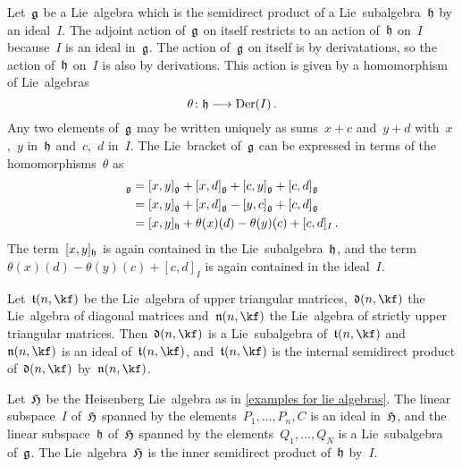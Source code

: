 \begin{fluff}
  \label{calculating structure of internal semidirect product}
  Let~$\mathfrak{g}$ be a Lie~algebra which is the semidirect product of a Lie~subalgebra~$\mathfrak{h}$ by an ideal~$I$.
  The adjoint action of~$\mathfrak{g}$ on itself restricts to an action of~$\mathfrak{h}$ on~$I$ because~$I$ is an ideal in~$\mathfrak{g}$.
  The action of~$\mathfrak{g}$ on itself is by derivatations, so the action of~$\mathfrak{h}$ on~$I$ is also by derivations.
  This action is given by a homomorphism of Lie~algebras
  \[
    \theta
    \colon
    \hlie
    \to
    \Der(I) \,.
  \]
  Any two elements of~$\mathfrak{g}$ may be written uniquely as sums~$x + c$ and~$y + d$ with~$x$,~$y$ in~$\mathfrak{h}$ and~$c$,~$d$ in~$I$.
  The Lie~bracket of~$\mathfrak{g}$ can be expressed in terms of the homomorphisms~$\theta$ as
  \begin{align*}
    [x + c, y + d]_{\glie}
    &=
    [x, y]_{\glie}
    + [x, d]_{\glie}
    + [c, y]_{\glie}
    + [c, d]_{\glie}
    \\
    &=
    [x, y]_{\glie}
    + [x, d]_{\glie}
    - [y, c]_{\glie}
    + [c, d]_{\glie}
    \\
    &=
    [x, y]_{\hlie}
    + \theta(x)(d)
    - \theta(y)(c)
    + [c, d]_I \,.
  \end{align*}
  The term~$[x,y]_{\mathfrak{h}}$ is again contained in the Lie~subalgebra~$\mathfrak{h}$, and the term~$\theta(x)(d) - \theta(y)(c) + [c,d]_I$ is again contained in the ideal~$I$.
\end{fluff}


\begin{example}
  Let~$\tlie(n, \kf)$ be the Lie~algebra of upper triangular matrices,~$\dlie(n, \kf)$ the Lie~algebra of diagonal matrices and~$\nlie(n, \kf)$ the Lie~algebra of strictly upper triangular matrices.
  Then~$\dlie(n, \kf)$ is a Lie~subalgebra of~$\tlie(n, \kf)$ and~$\nlie(n, \kf)$ is an ideal of~$\tlie(n, \kf)$, and~$\tlie(n, \kf)$ is the internal semidirect product of~$\dlie(n, \kf)$ by~$\nlie(n, \kf)$.
\end{example}


\begin{example}
  Let~$\mathfrak{H}$ be the Heisenberg Lie~algebra as in \cref{examples for lie algebras}.
  The linear subspace~$I$ of~$\mathfrak{H}$ spanned by the elements~$P_1, \dotsc, P_n, C$ is an ideal in~$\mathfrak{H}$, and the linear subspace~$\mathfrak{h}$ of~$\mathfrak{H}$ spanned by the elements~$Q_1, \dotsc, Q_N$ is a Lie~subalgebra of~$\mathfrak{g}$.
  The Lie~algebra~$\mathfrak{H}$ is the inner semidirect product of~$\mathfrak{h}$ by~$I$.
\end{example}

